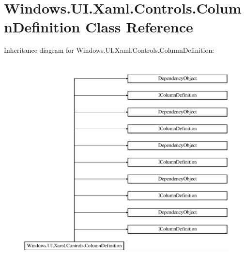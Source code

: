 \hypertarget{class_windows_1_1_u_i_1_1_xaml_1_1_controls_1_1_column_definition}{}\section{Windows.\+U\+I.\+Xaml.\+Controls.\+Column\+Definition Class Reference}
\label{class_windows_1_1_u_i_1_1_xaml_1_1_controls_1_1_column_definition}
Inheritance diagram for Windows.\+U\+I.\+Xaml.\+Controls.\+Column\+Definition\+:\begin{figure}[H]
\begin{center}
\leavevmode
\includegraphics[height=11.000000cm]{class_windows_1_1_u_i_1_1_xaml_1_1_controls_1_1_column_definition}
\end{center}
\end{figure}
